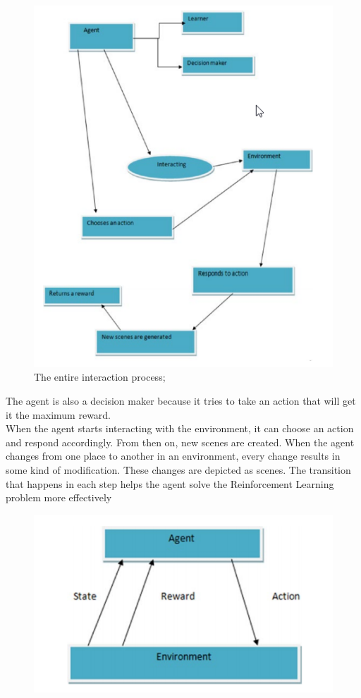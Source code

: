 \documentclass[14pt,a4paper]{report}  %
\begin{document}
\begin{itemize}
\begin{figure}[hbt!]
\begin{center}
\includegraphics[scale=0.74]{The_entire_interaction_process}
\caption{The entire interaction process; }%
\end{center}
\end{figure}
The agent is also a decision maker because it tries to take an action that will get it the 
maximum reward.\\
When the agent starts interacting with the environment, it can choose an action and 
respond accordingly.
From then on, new scenes are created. When the agent changes from one place to 
another in an environment, every change results in some kind of modification. These 
changes are depicted as scenes. The transition that happens in each step helps the agent 
solve the Reinforcement Learning problem more effectively\\
\begin{figure}[hbt!]
\begin{center}
\includegraphics[scale=0.74]{Scenario_of_state_changes}

\end{center}
\end{figure}
\end{itemize}
\end{document}
